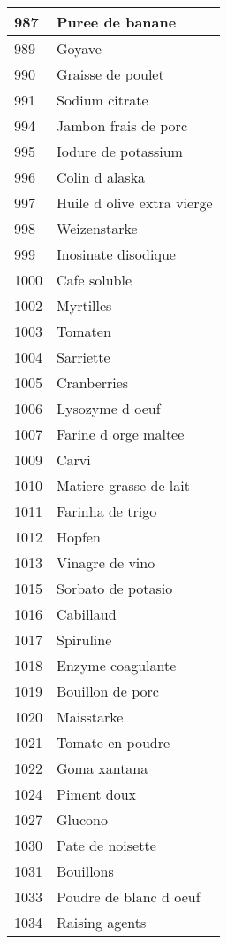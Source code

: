 \begin{longtable}{|l|l|}
987 & Puree de banane \\ \hline 
989 & Goyave \\ \hline 
990 & Graisse de poulet \\ \hline 
991 & Sodium citrate \\ \hline 
994 & Jambon frais de porc \\ \hline 
995 & Iodure de potassium \\ \hline 
996 & Colin d alaska \\ \hline 
997 & Huile d olive extra vierge \\ \hline 
998 & Weizenstarke \\ \hline 
999 & Inosinate disodique \\ \hline 
1000 & Cafe soluble \\ \hline 
1002 & Myrtilles \\ \hline 
1003 & Tomaten \\ \hline 
1004 & Sarriette \\ \hline 
1005 & Cranberries \\ \hline 
1006 & Lysozyme d oeuf \\ \hline 
1007 & Farine d orge maltee \\ \hline 
1009 & Carvi \\ \hline 
1010 & Matiere grasse de lait \\ \hline 
1011 & Farinha de trigo \\ \hline 
1012 & Hopfen \\ \hline 
1013 & Vinagre de vino \\ \hline 
1015 & Sorbato de potasio \\ \hline 
1016 & Cabillaud \\ \hline 
1017 & Spiruline \\ \hline 
1018 & Enzyme coagulante \\ \hline 
1019 & Bouillon de porc \\ \hline 
1020 & Maisstarke \\ \hline 
1021 & Tomate en poudre \\ \hline 
1022 & Goma xantana \\ \hline 
1024 & Piment doux \\ \hline 
1027 & Glucono \\ \hline 
1030 & Pate de noisette \\ \hline 
1031 & Bouillons \\ \hline 
1033 & Poudre de blanc d oeuf \\ \hline 
1034 & Raising agents \\ \hline 

\end{longtable}
